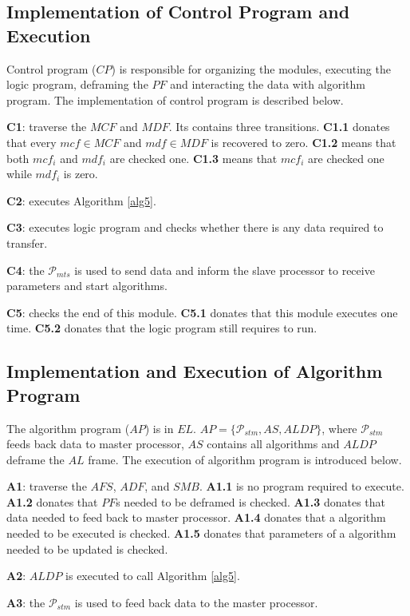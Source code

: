 \documentclass[journal,UTF8]{IEEEtran}
\begin{document}
\subsection{Implementation of Control Program and Execution}
Control program ($CP$) is responsible for organizing the modules, executing the logic program, deframing the $PF$ and interacting the data with algorithm program. The implementation of control program is described below.

\textbf{C1}: traverse the $MCF$ and $MDF$. Its contains three transitions. \textbf{C1.1} donates that every $mcf\in MCF$ and $mdf \in MDF$ is recovered to zero. \textbf{C1.2} means that both $mcf_i$ and $mdf_i$ are checked one. \textbf{C1.3} means that $mcf_i$ are checked one while $mdf_i$ is zero.

\textbf{C2}: executes Algorithm \ref{alg5}. 

\textbf{C3}: executes logic program and checks whether there is any data required to transfer.  

\textbf{C4}: the $\mathcal{P}_{mts}$ is used to send data and inform the slave processor to receive parameters and start algorithms.   

\textbf{C5}: checks the end of this module. \textbf{C5.1} donates that this module executes one time. \textbf{C5.2} donates that the logic program still requires to run.  

\subsection{Implementation and Execution of Algorithm Program }
The algorithm program ($AP$) is in $EL$. $AP=\{\mathcal{P}_{stm}, AS, ALDP\}$, where $\mathcal{P}_{stm}$ feeds back data to master processor, $AS$ contains all algorithms and $ALDP$ deframe the $AL$ frame. The execution of algorithm program is introduced below.

\textbf{A1}: traverse the $AFS$, $ADF$, and $SMB$. \textbf{A1.1} is no program required to execute. \textbf{A1.2} donates that $PF$s needed to be deframed is checked. \textbf{A1.3} donates that data needed to feed back to master processor. \textbf{A1.4} donates that a algorithm needed to be executed is checked. \textbf{A1.5} donates that parameters of a algorithm needed to be updated is checked.  

\textbf{A2}: $ALDP$ is executed to call Algorithm \ref{alg5}. 

\textbf{A3}: the $\mathcal{P}_{stm}$ is used to feed back data to the master processor. 
\end{document}
